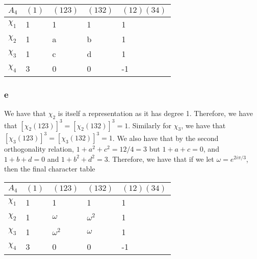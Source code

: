 \documentclass[]{article}
\begin{document}
\begin{table}[h!]
	\centering
	\begin{tabular}{|l|l|l|l|l|}
		\hline
		$A_4$    & $(1)$ & $(123)$ & $(132)$ & $(12)(34)$ \\ \hline
		$\chi_1$ & 1     & 1       & 1       & 1          \\ \hline
		$\chi_2$ & 1     & a       & b       & 1          \\ \hline
		$\chi_3$ & 1     & c       & d       & 1          \\ \hline
		$\chi_4$ & 3     & 0       & 0       & -1         \\ \hline
	\end{tabular}
\end{table}

\subsubsection*{e}
We have that $\chi_2$ is itself a representation as it has degree 1. Therefore, we have that $[\chi_2(123)]^3 = [\chi_2(132)]^3 = 1$. Similarly for $\chi_3$, we have that $[\chi_3(123)]^3 = [\chi_3(132)]^3 = 1$. We also have that by the second orthogonality relation,  $1 + a^2 + c^2 = 12/4 = 3$ but $1 + a + c = 0$, and $1 + b + d = 0$ and $1 + b^2 + d^2 = 3$. Therefore, we have that if we let $\omega = e^{2 i \pi/3}$, then the final character table 
\begin{table}[h!]
	\centering
	\begin{tabular}{|l|l|l|l|l|}
		\hline
			$A_4$    & $(1)$ & $(123)$    & $(132)$    & $(12)(34)$ \\ \hline
			$\chi_1$ & 1     & 1          & 1          & 1          \\ \hline
			$\chi_2$ & 1     & $\omega$   & $\omega^2$ & 1          \\ \hline
			$\chi_3$ & 1     & $\omega^2$ & $\omega$   & 1          \\ \hline
			$\chi_4$ & 3     & 0          & 0          & -1         \\ \hline
	\end{tabular}
\end{table}
\end{document}
